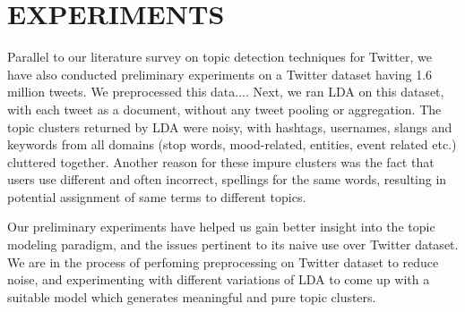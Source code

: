 \section{\uppercase{Experiments}}
Parallel to our literature survey on topic detection techniques for Twitter, we have also conducted preliminary experiments on a Twitter dataset having 1.6 million tweets. We preprocessed this data.... Next, we ran LDA on this dataset, with each tweet as a document, without any tweet pooling or aggregation. The topic clusters returned by LDA were noisy, with hashtags, usernames, slangs and keywords from all domains (stop words, mood-related, entities, event related etc.) cluttered together. Another reason for these impure clusters was the fact that users use different and often incorrect, spellings for the same words, resulting in potential assignment of same terms to different topics.

Our preliminary experiments have helped us gain better insight into the topic modeling paradigm, and the issues pertinent to its naive use over Twitter dataset. We are in the process of perfoming preprocessing on Twitter dataset to reduce noise, and experimenting with different variations of LDA to come up with a suitable model which generates meaningful and pure topic clusters.
